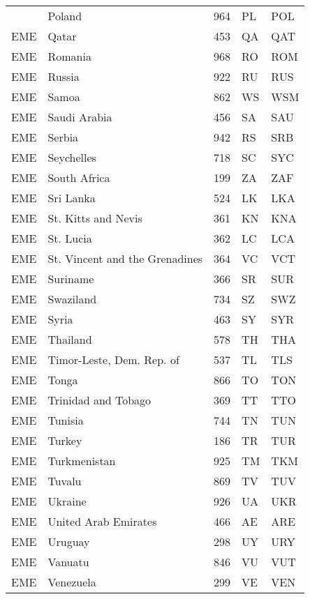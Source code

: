 \documentclass[12pt,a4paper]{article}
\begin{document}
\begin{ThreePartTable}
\begin{longtable}
{EME} & Poland & 964 & PL & POL \\
{EME} & Qatar & 453 & QA & QAT \\
{EME} & Romania & 968 & RO & ROM \\
{EME} & Russia & 922 & RU & RUS \\
{EME} & Samoa & 862 & WS & WSM \\
{EME} & Saudi Arabia & 456 & SA & SAU \\
{EME} & Serbia & 942 & RS & SRB \\
{EME} & Seychelles & 718 & SC & SYC \\
{EME} & South Africa & 199 & ZA & ZAF \\
{EME} & Sri Lanka & 524 & LK & LKA \\
{EME} & St. Kitts and Nevis & 361 & KN & KNA \\
{EME} & St. Lucia & 362 & LC & LCA \\
{EME} & St. Vincent and the Grenadines & 364 & VC & VCT \\
{EME} & Suriname & 366 & SR & SUR \\
{EME} & Swaziland & 734 & SZ & SWZ \\
{EME} & Syria & 463 & SY & SYR \\
{EME} & Thailand & 578 & TH & THA \\
{EME} & Timor-Leste, Dem. Rep. of & 537 & TL & TLS \\
{EME} & Tonga & 866 & TO & TON \\
{EME} & Trinidad and Tobago & 369 & TT & TTO \\
{EME} & Tunisia & 744 & TN & TUN \\
{EME} & Turkey & 186 & TR & TUR \\
{EME} & Turkmenistan & 925 & TM & TKM \\
{EME} & Tuvalu & 869 & TV & TUV \\
{EME} & Ukraine & 926 & UA & UKR \\
{EME} & United Arab Emirates & 466 & AE & ARE \\
{EME} & Uruguay & 298 & UY & URY \\
{EME} & Vanuatu & 846 & VU & VUT \\
{EME} & Venezuela & 299 & VE & VEN \\
    
  \end{longtable}
\end{ThreePartTable}
\end{document}
